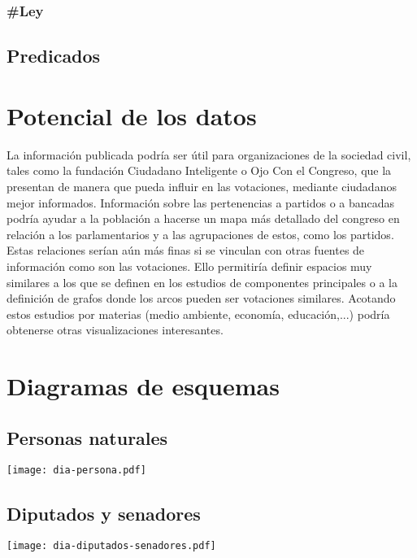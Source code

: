 \documentclass[letterpaper,titlepage]{article}
\begin{document}
\subsubsection{\#Ley}

\begin{description}
  
\end{description}

\subsection{Predicados}
\label{predicados}



\section{Potencial de los datos}

La información publicada podría ser útil para organizaciones de la
sociedad civil, tales como la fundación Ciudadano Inteligente o Ojo
Con el Congreso, que la presentan de manera que pueda influir en las
votaciones, mediante ciudadanos mejor informados. Información sobre
las pertenencias a partidos o a bancadas podría ayudar a la población
a hacerse un mapa más detallado del congreso en relación a los
parlamentarios y a las agrupaciones de estos, como los partidos. Estas
relaciones serían aún más finas si se vinculan con otras fuentes de
información como son las votaciones. Ello permitiría definir espacios
muy similares a los que se definen en los estudios de componentes
principales o a la definición de grafos donde los arcos pueden ser
votaciones similares. Acotando estos estudios por materias (medio
ambiente, economía, educación,...) podría obtenerse otras
visualizaciones interesantes.

\newpage
\appendix

\section{Diagramas de esquemas}
\label{diagramas}

\subsection{Personas naturales}
\begin{center}
  \texttt{[image: dia-persona.pdf]}
\end{center}

\subsection{Diputados y senadores}
\begin{center}
  \texttt{[image: dia-diputados-senadores.pdf]}
\end{center}
\end{document}
